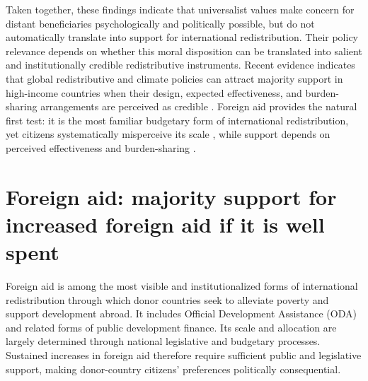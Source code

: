 \documentclass[11pt,a4paper]{article}
\begin{document}
Taken together, these findings indicate that universalist values make concern for distant beneficiaries psychologically and politically possible, but do not automatically translate into support for international redistribution. Their policy relevance depends on whether this moral disposition can be translated into salient and institutionally credible redistributive instruments. Recent evidence indicates that global redistributive and climate policies can attract majority support in high-income countries when their design, expected effectiveness, and burden-sharing arrangements are perceived as credible \citep{fabre_majority_2025}. Foreign aid provides the natural first test: it is the most familiar budgetary form of international redistribution, yet citizens systematically misperceive its scale \citep{kaufmann_foreign_2019}, while support depends on perceived effectiveness and burden-sharing \citep{gampfer_obtaining_2014,fabre_majority_2025}.


\section{Foreign aid: majority support for increased foreign aid if it is well spent}

Foreign aid is among the most visible and institutionalized forms of international redistribution through which donor countries seek to alleviate poverty and support development abroad. It includes Official Development Assistance (ODA) and related forms of public development finance. Its scale and allocation are largely determined through national legislative and budgetary processes. Sustained increases in foreign aid therefore require sufficient public and legislative support, making donor-country citizens' preferences politically consequential.
\end{document}

